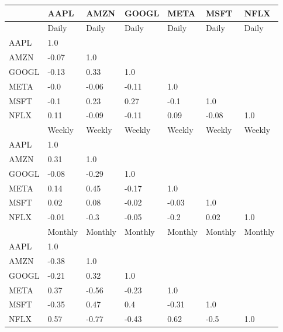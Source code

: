 \begin{tabular}{lllllll}
\toprule
{} &     AAPL &     AMZN &    GOOGL &     META &     MSFT &     NFLX \\
\midrule
      &    Daily &    Daily &    Daily &    Daily &    Daily &    Daily \\
AAPL  &      1.0 &          &          &          &          &          \\
AMZN  &    -0.07 &      1.0 &          &          &          &          \\
GOOGL &    -0.13 &     0.33 &      1.0 &          &          &          \\
META  &     -0.0 &    -0.06 &    -0.11 &      1.0 &          &          \\
MSFT  &     -0.1 &     0.23 &     0.27 &     -0.1 &      1.0 &          \\
NFLX  &     0.11 &    -0.09 &    -0.11 &     0.09 &    -0.08 &      1.0 \\
      &   Weekly &   Weekly &   Weekly &   Weekly &   Weekly &   Weekly \\
AAPL  &      1.0 &          &          &          &          &          \\
AMZN  &     0.31 &      1.0 &          &          &          &          \\
GOOGL &    -0.08 &    -0.29 &      1.0 &          &          &          \\
META  &     0.14 &     0.45 &    -0.17 &      1.0 &          &          \\
MSFT  &     0.02 &     0.08 &    -0.02 &    -0.03 &      1.0 &          \\
NFLX  &    -0.01 &     -0.3 &    -0.05 &     -0.2 &     0.02 &      1.0 \\
      &  Monthly &  Monthly &  Monthly &  Monthly &  Monthly &  Monthly \\
AAPL  &      1.0 &          &          &          &          &          \\
AMZN  &    -0.38 &      1.0 &          &          &          &          \\
GOOGL &    -0.21 &     0.32 &      1.0 &          &          &          \\
META  &     0.37 &    -0.56 &    -0.23 &      1.0 &          &          \\
MSFT  &    -0.35 &     0.47 &      0.4 &    -0.31 &      1.0 &          \\
NFLX  &     0.57 &    -0.77 &    -0.43 &     0.62 &     -0.5 &      1.0 \\
\bottomrule
\end{tabular}
